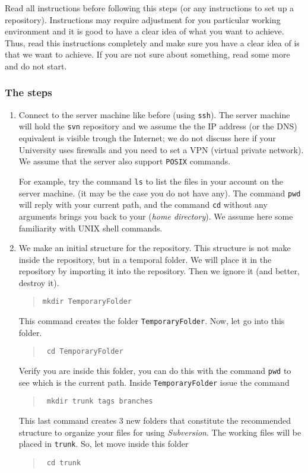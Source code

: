 \documentclass[article,12pt]{article}
\begin{document}
Read all instructions before following this steps (or any instructions to
set up a repository). Instructions may require adjustment for you
particular working environment and it is good to have
a clear idea of what you want to achieve.
Thus, read this instructions completely and make sure you have
a clear idea of is that we want to achieve.
If you are not sure about something, read some more and do not start.

\subsubsection*{The steps }
\begin{enumerate}
\item
Connect to the server machine like before (using {\tt ssh}).
The server machine will hold the {\tt svn} repository
and we assume the the IP address (or the DNS) equivalent
is visible trough the Internet; we do not discuss here if your
University uses firewalls and you need to set a VPN (virtual
private network).
We assume that the server also support {\tt POSIX} commands.

For example, try the command 
 {\tt ls} to list the files in your account on the server machine.
(it may be the case you do not have any).
The command {\tt pwd} will reply with your current path,
and the command 
{\tt cd} without any arguments brings you back to your 
({\em home directory}). We assume here some familiarity with UNIX shell commands.
\item We make an initial structure for the repository.
This structure is not make inside the repository, but in a temporal
folder.  We will place it in the repository by importing it into
the repository. Then we ignore it (and better, destroy it).
\begin{quote}
{\tt mkdir TemporaryFolder}
\end{quote}
This command creates the folder
{\tt TemporaryFolder}.
Now, let go into this folder.
\begin{quote}
{\tt
cd TemporaryFolder
}
\end{quote}
Verify you are inside this folder, you can do this with the command
 {\tt pwd} to see which is the current path.
Inside {\tt TemporaryFolder} issue the command
\begin{quote}
{\tt
mkdir trunk tags branches
}
\end{quote}
This last command creates 3 new folders that constitute the recommended
structure to organize your files for using
{\em Subversion}.
The working files will be placed in
 {\tt trunk}.
So, let move inside this folder
\begin{quote}
{\tt
cd trunk
}
\end{quote}


\end{enumerate}
\end{document}
